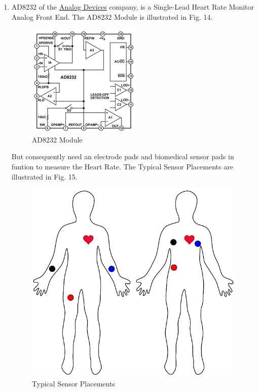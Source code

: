\documentclass[10pt,journal,compsoc]{IEEEtran}
\begin{document}
\begin{enumerate}[\IEEEsetlabelwidth{3)}]

\item AD8232 of the \href{http://www.analog.com/en/index.html}{Analog Devices} company, is a Single-Lead Heart Rate Monitor Analog Front End. The AD8232 Module is illustrated in Fig. 14.

\begin{figure}[h]
  \centering
  \captionsetup{justification=centering}
  \includegraphics[scale=.45]{es13}
  \caption{AD8232 Module}
  \label{fig:fig14}
\end{figure}

%

But consequently need an electrode pads and biomedical sensor pads in funtion to measure the Heart Rate. The Typical Sensor Placements are illustrated in Fig. 15.

\begin{figure}[h]
  \centering
  \captionsetup{justification=centering}
  \includegraphics[scale=.35]{es14}
  \caption{Typical Sensor Placements}
  \label{fig:fig15}
\end{figure}


\end{enumerate}
\end{document}
